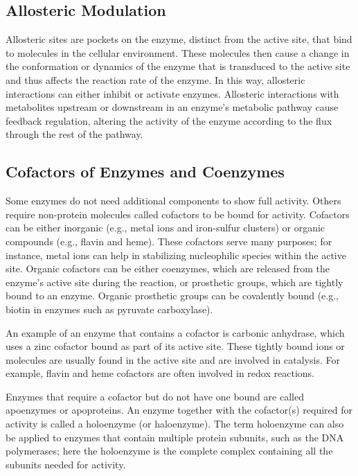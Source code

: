 \hypertarget{allosteric-modulation}{%
\subsection{Allosteric Modulation}\label{allosteric-modulation}}

Allosteric sites are pockets on the enzyme, distinct from the active site, that bind to molecules in the cellular environment. These molecules then cause a change in the conformation or dynamics of the enzyme that is transduced to the active site and thus affects the reaction rate of the enzyme. In this way, allosteric interactions can either inhibit or activate enzymes. Allosteric interactions with metabolites upstream or downstream in an enzyme's metabolic pathway cause feedback regulation, altering the activity of the enzyme according to the flux through the rest of the pathway.

\hypertarget{cofactors-of-enzymes-and-coenzymes}{%
\subsection{Cofactors of Enzymes and Coenzymes}\label{cofactors-of-enzymes-and-coenzymes}}

Some enzymes do not need additional components to show full activity. Others require non-protein molecules called cofactors to be bound for activity. Cofactors can be either inorganic (e.g., metal ions and iron-sulfur clusters) or organic compounds (e.g., flavin and heme). These cofactors serve many purposes; for instance, metal ions can help in stabilizing nucleophilic species within the active site. Organic cofactors can be either coenzymes, which are released from the enzyme's active site during the reaction, or prosthetic groups, which are tightly bound to an enzyme. Organic prosthetic groups can be covalently bound (e.g., biotin in enzymes such as pyruvate carboxylase).

An example of an enzyme that contains a cofactor is carbonic anhydrase, which uses a zinc cofactor bound as part of its active site. These tightly bound ions or molecules are usually found in the active site and are involved in catalysis. For example, flavin and heme cofactors are often involved in redox reactions.

Enzymes that require a cofactor but do not have one bound are called apoenzymes or apoproteins. An enzyme together with the cofactor(s) required for activity is called a holoenzyme (or haloenzyme). The term holoenzyme can also be applied to enzymes that contain multiple protein subunits, such as the DNA polymerases; here the holoenzyme is the complete complex containing all the subunits needed for activity.

